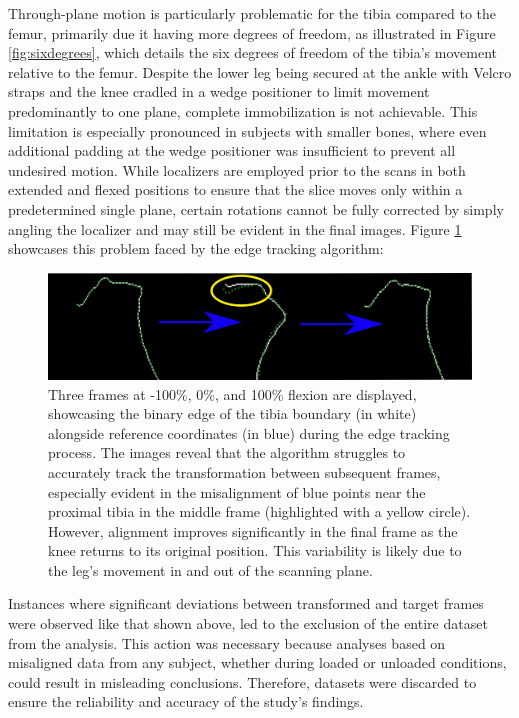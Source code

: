 \documentclass{micro-econ-thesis}
\begin{document}
Through-plane motion is particularly problematic for the tibia compared to the femur, primarily due it having more degrees of freedom, as illustrated in Figure \ref{fig:sixdegrees}, which details the six degrees of freedom of the tibia's movement relative to the femur. Despite the lower leg being secured at the ankle with Velcro straps and the knee cradled in a wedge positioner to limit movement predominantly to one plane, complete immobilization is not achievable. This limitation is especially pronounced in subjects with smaller bones, where even additional padding at the wedge positioner was insufficient to prevent all undesired motion. While localizers are employed prior to the scans in both extended and flexed positions to ensure that the slice moves only within a predetermined single plane, certain rotations cannot be fully corrected by simply angling the localizer and may still be evident in the final images. 
Figure \ref{fig:edgebad} showcases this problem faced by the edge tracking algorithm: 

\begin{figure}[H]
	\centering
	\includegraphics[width=0.9\linewidth]{three_try2}
	\caption{Three frames at -100\%, 0\%, and 100\% flexion are displayed, showcasing the binary edge of the tibia boundary (in white) alongside reference coordinates (in blue) during the edge tracking process. The images reveal that the algorithm struggles to accurately track the transformation between subsequent frames, especially evident in the misalignment of blue points near the proximal tibia in the middle frame (highlighted with a yellow circle). However, alignment improves significantly in the final frame as the knee returns to its original position. This variability is likely due to the leg's movement in and out of the scanning plane.}
	\label{fig:edgebad}
\end{figure}


Instances where significant deviations between transformed and target frames were observed like that shown above, led to the exclusion of the entire dataset from the analysis. This action was necessary because analyses based on misaligned data from any subject, whether during loaded or unloaded conditions, could result in misleading conclusions. Therefore, datasets were discarded to ensure the reliability and accuracy of the study's findings.
\end{document}
